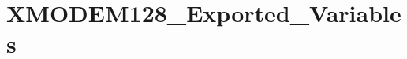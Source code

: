 \hypertarget{group___x_m_o_d_e_m128___exported___variables}{}\section{X\+M\+O\+D\+E\+M128\+\_\+\+Exported\+\_\+\+Variables}
\label{group___x_m_o_d_e_m128___exported___variables}
